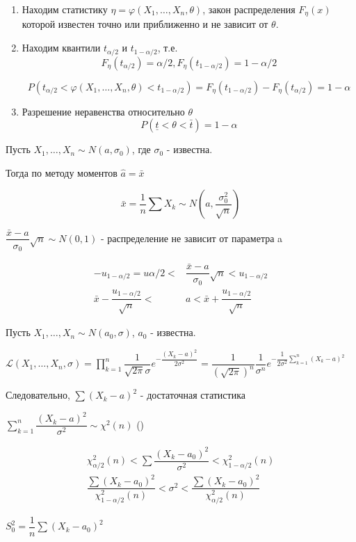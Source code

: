 \begin{enumerate}
  \item Находим статистику $\eta = \varphi(X_1, \dots, X_n, \theta)$, закон распределения $F_\eta (x)$ которой известен точно или приближенно и не зависит от $\theta$.
  \item Находим квантили $t_{\alpha/2}$ и $t_{1-\alpha/2}$, т.е.
    $$ F_\eta(t_{\alpha/2})  = \alpha/2, F_\eta(t_{1-\alpha/2}) = 1 - \alpha/2$$

    \[
      P(t_{\alpha/2} < \varphi(X_1, \dots, X_n, \theta) < t_{1-{\alpha/2}}) = F_\eta (t_{1 - \alpha/2}) - F_\eta (t_{\alpha/2}) = 1- \alpha
    \]
  \item Разрешение неравенства относительно $\theta$
    $$P(\underline{t} < \theta < \bar t) = 1-\alpha$$
\end{enumerate}

\begin{ex}
  Пусть $X_1, \dots, X_n \sim N(a, \sigma_0)$, где $\sigma_0$ - известна.

  Тогда по методу моментов $\hat a = \bar x$

  \[
    \bar x = \dfrac{1}{n} \sum X_k \sim N(a, \dfrac{\sigma_0^2}{\sqrt{n}})
  \]

  $\dfrac{\bar x - a}{\sigma_0} \sqrt{n} \sim N(0, 1)$ - распределение не зависит от параметра a

  \begin{align*}
    -u_{1-\alpha/2} = u{\alpha/2} < &\dfrac{\bar x - a}{\sigma_0} \sqrt{n} < u_{1-\alpha/2} \\
    \bar x - \dfrac{u_{1-\alpha/2}}{\sqrt{n}} < &a < \bar x + \dfrac{u_{1-\alpha/2}}{\sqrt{n}}
  \end{align*} 
 \end{ex}

\begin{ex}
  Пусть $X_1, \dots, X_n \sim N(a_0, \sigma)$, $a_0$ - известна.

  $\mathcal{L} (X_1, \dots, X_n, \sigma) = \prod\limits_{k=1}^n \dfrac{1}{\sqrt{2\pi} \sigma} e^{-\dfrac{(X_k - a)^2}{2\sigma^2}} = \dfrac{1}{(\sqrt{2\pi})^n} \dfrac{1}{\sigma^n} e^{-\dfrac{1}{2\sigma^2} \sum_{k=1}^n (X_k-a)^2}$

  Следовательно, $\sum (X_k-a)^2$ - достаточная статистика

  $\sum\limits_{k=1}^n \dfrac{(X_k-a)^2}{\sigma^2} \sim \chi^2 (n)$ ()

  \begin{gather*} 
    \chi^2_{\alpha/2} (n) < \sum \dfrac{(X_k - a_0)^2}{\sigma^2} < \chi^2_{1 - \alpha/2} (n) \\
    \dfrac{\sum (X_k-a_0)^2}{\chi^2_{1 - \alpha/2} (n)} < \sigma^2 < \dfrac{\sum (X_k - a_0)^2}{\chi^2_{\alpha/2}(n)} 
  \end{gather*}

  $S_0^2 = \dfrac{1}{n} \sum (X_k-a_0)^2$ %
\end{ex}

